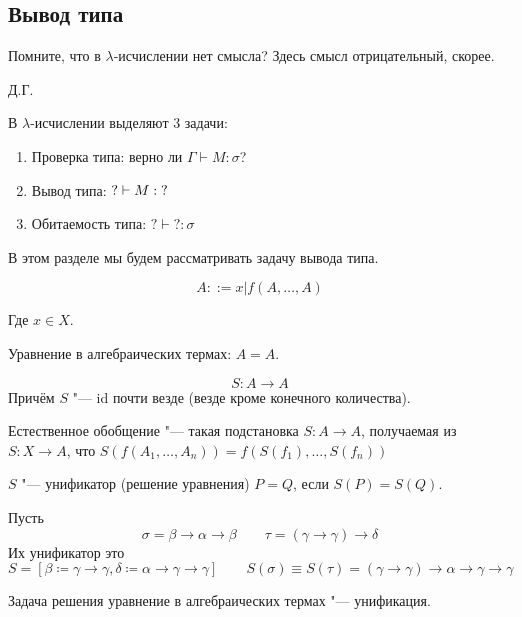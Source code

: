 \subsection{\texorpdfstring{Вывод типа}{Type deduction}}
\epigraph{Помните, что в $\lambda$-исчислении нет смысла? Здесь смысл отрицательный, скорее.}{Д.Г.}

В $\lambda$-исчислении выделяют 3 задачи:
\begin{enumerate}[label=(\asbuk*)]
    \item Проверка типа: верно ли $\Gamma \vdash M : \sigma$?
    \item Вывод типа: $? \vdash M : \mathinner{?}$
    \item Обитаемость типа: $? \vdash ? : \sigma$
\end{enumerate}

В этом разделе мы будем рассматривать задачу вывода типа.

\begin{definition}
    \begin{bnf}
    \[
        A ::= x | f\left(A, \ldots, A\right)
    \]
    \end{bnf}
    Где $x \in X$.
\end{definition}

Уравнение в алгебраических термах: $A = A$.

\begin{definition}[$S$-подстановка]
    \[
        S : A \rightarrow A
    \]
    Причём $S$ "--- id почти везде (везде кроме конечного количества).
\end{definition}

\begin{definition}
    Естественное обобщение "--- такая подстановка $S : A \rightarrow A$, получаемая из $S : X \rightarrow A$, что
    $S\left(f\left(A_1, \dots, A_n\right)\right) = f\left(S(f_1), \ldots, S(f_n)\right)$
\end{definition}

\begin{definition}[унификатор] \label{unificator}
    $S$ "--- унификатор (решение уравнения) $P=Q$, если $S(P)=S(Q)$.
\end{definition}
\begin{example}
    Пусть
    \[
        \sigma = \beta\rightarrow\alpha\rightarrow\beta \qquad \tau = (\gamma\rightarrow\gamma)\rightarrow\delta
    \]
    Их унификатор это
    \[
        S = [\beta \coloneqq \gamma\rightarrow\gamma, \delta \coloneqq \alpha\rightarrow\gamma\rightarrow\gamma]
        \qquad S(\sigma) \equiv S(\tau) = (\gamma\rightarrow\gamma)\rightarrow\alpha\rightarrow\gamma\rightarrow\gamma
    \]
\end{example}
Задача решения уравнение в алгебраических термах "--- унификация.

